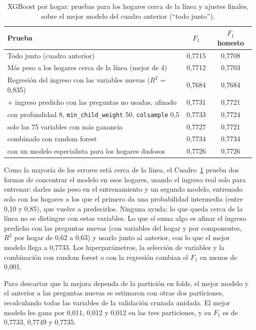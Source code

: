 \documentclass[12pt]{article}
\begin{document}
\begin{table}[H]
  \centering
  \small
  \caption{XGBoost por hogar: pruebas para los hogares cerca de la línea y
    ajustes finales, sobre el mejor modelo del cuadro anterior (``todo
    junto'').}
  \label{tab:mejoras3}
  \begin{tabular}{@{}p{8.6cm}cc@{}}
    \toprule
    Prueba & $F_1$ & $F_1$ honesto \\
    \midrule
    Todo junto (cuadro anterior) & 0,7715 & 0,7708 \\
    Más peso a los hogares cerca de la línea (mejor de 4) & 0,7712 & 0,7703 \\
    Regresión del ingreso con las variables nuevas ($R^2$ = 0,835) & 0,7684 & 0,7684 \\
    + ingreso predicho con las preguntas no usadas, afinado & 0,7731 & 0,7721 \\
    \quad con profundidad 8, \texttt{min\_child\_weight} 50, \texttt{colsample} 0,5 & 0,7733 & 0,7724 \\
    \quad solo las 75 variables con más ganancia & 0,7727 & 0,7721 \\
    \quad combinado con random forest & 0,7734 & 0,7734 \\
    \quad con un modelo especialista para los hogares dudosos & 0,7726 & 0,7726 \\
    \bottomrule
  \end{tabular}
\end{table}

Como la mayoría de los errores está cerca de la línea, el
Cuadro~\ref{tab:mejoras3} prueba dos formas de concentrar el modelo en esos
hogares, usando el ingreso real solo para entrenar: darles más peso en el
entrenamiento y un segundo modelo, entrenado solo con los hogares a los que el
primero da una probabilidad intermedia (entre 0,10 y 0,85), que vuelve a
predecirlos. Ninguna ayuda: lo que queda cerca de la línea no se distingue
con estas variables. Lo que sí suma algo es afinar el ingreso predicho con las
preguntas nuevas (con variables del hogar y por componentes, $R^2$ por hogar
de 0,62 a 0,63) y usarlo junto al anterior, con lo que el mejor modelo llega a
0,7733. Los hiperparámetros, la selección de variables y la combinación con
random forest o con la regresión cambian el $F_1$ en menos de 0,001.

Para descartar que la mejora dependa de la partición en folds, el mejor
modelo y el anterior a las preguntas nuevas se estimaron con otras dos
particiones, recalculando todas las variables de la validación cruzada
anidada. El mejor modelo les gana por 0,011, 0,012 y 0,012 en las tres
particiones, y su $F_1$ es de 0,7733, 0,7749 y 0,7735.
\end{document}

